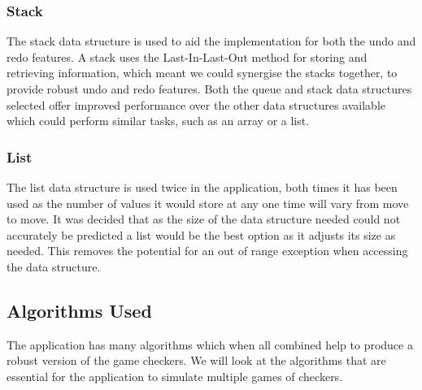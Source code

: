 \documentclass[10pt, a4paper]{article}
\begin{document}
    \subsubsection{Stack}
    The stack data structure is used to aid the 
    \newline
    implementation for both the undo and redo features. A stack uses the Last-In-Last-Out method for storing and 
    \newline
    retrieving information, which meant we could synergise the stacks together, to provide robust undo and redo 
    \newline
    features.
    \newline
    Both the queue and stack data structures selected 
    \newline 
    offer improved performance over the other data structures available which could perform similar tasks, such as an array or a list.
    
    \subsubsection{List}
    The list data structure is used twice in the application, both times it has been used as the number of values it would store at any one time will vary from move to move. It was decided that as the size of the data 
    \newline
    structure needed could not accurately be predicted a list would be the best option as it adjusts its size as needed. This removes the potential for an out of range exception when accessing the data structure.
    
    
    
    \subsection{Algorithms Used}
    The application has many algorithms which when all 
    \newline
    combined help to produce a robust version of the game checkers. We will look at the algorithms that are essential for the application to simulate multiple games of checkers.
    
\end{document}
